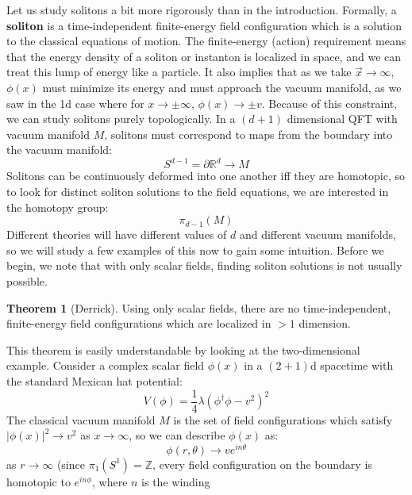 \documentclass[11pt, oneside]{article}   	%
\theoremstyle{definition}
\newtheorem{theorem}{Theorem}[section]
\begin{document}
Let us study solitons a bit more rigorously than in the introduction. Formally, a \textbf{soliton} is a time-independent 
finite-energy field configuration which is a solution to the classical equations of motion. The finite-energy (action) requirement means that 
the energy density of a soliton or instanton is localized in space, and we can treat this lump of energy like a particle. It also implies that as we take $\vec x\rightarrow\infty$, 
$\phi(x)$ must minimize its energy and must approach the vacuum manifold, as we saw in the 1d case where for $x\rightarrow\pm\infty$, 
$\phi(x)\rightarrow \pm v$. Because of this constraint, we can study solitons purely topologically. In a $(d + 1)$ dimensional QFT with vacuum 
manifold $M$, solitons must correspond to maps from the boundary into the vacuum manifold:
\begin{equation}
	S^{d - 1} = \partial\mathbb R^d\rightarrow M
\end{equation}
Solitons can be continuously deformed into one another iff they are homotopic, so to look for distinct soliton solutions to the field equations, 
we are interested in the homotopy group:
\begin{equation}
	\pi_{d - 1}(M)
\end{equation}
Different theories will have different values of $d$ and different vacuum manifolds, so we will study a few examples of this now to gain some 
intuition. Before we begin, we note that with only scalar fields, finding soliton solutions is not usually possible.
\begin{theorem}[Derrick]
	Using only scalar fields, there are no time-independent, finite-energy field configurations which are localized in $> 1$ dimension.
\end{theorem}
This theorem is easily understandable by looking at the two-dimensional example. Consider a complex scalar field $\phi(x)$
in a $(2 + 1)$d spacetime with the standard Mexican hat potential:
\begin{equation}
	V(\phi) = \frac{1}{4}\lambda (\phi^\dagger\phi - v^2)^2
\end{equation}
The classical vacuum manifold $M$ is the set of field configurations which satisfy $|\phi(x)|^2\rightarrow v^2$ as $x\rightarrow\infty$, so we can 
describe $\phi(x)$ as:
\begin{equation}
	\phi(r, \theta)\rightarrow ve^{in\theta}
\end{equation}
as $r\rightarrow\infty$ (since $\pi_1(S^1) = \mathbb Z$, every field configuration on the boundary is homotopic to $e^{in\phi}$, where $n$ is the winding 
\end{document}
